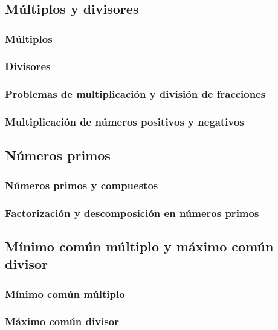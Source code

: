 \documentclass[11pt]{book}
\begin{document}
\pagestyle{empty}

\restoregeometry
{}
\tableofcontents
\newpage
\chapter{}
\pagestyle{fancy}
\newpage
\newpage \thispagestyle{plain}
\section{Múltiplos y divisores}
\subsection{Múltiplos}
\subsection{Divisores}
\subsection{Problemas de multiplicación y división de fracciones}
\subsection{Multiplicación de números positivos y negativos}

\newpage \thispagestyle{plain}
\section{Números primos}
\subsection{Números primos y compuestos}
\subsection{Factorización y descomposición en números primos}

\newpage \thispagestyle{plain}
\section{Mínimo común múltiplo y máximo común divisor}
\subsection{Mínimo común múltiplo}
\subsection{Máximo común divisor}
\end{document}
